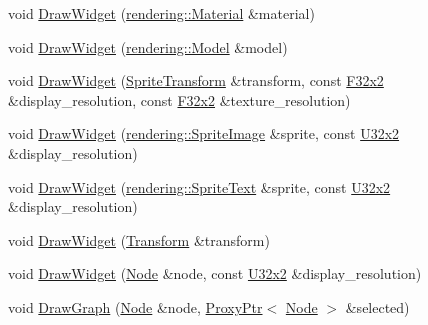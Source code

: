 \begin{DoxyCompactItemize}
\item 
void \mbox{\hyperlink{namespacemage_1_1script_1_1anonymous__namespace_02editor__script_8cpp_03_a5e0761853945b8519c6b8f39b888420a}{Draw\+Widget}} (\mbox{\hyperlink{classmage_1_1rendering_1_1_material}{rendering\+::\+Material}} \&material)
\item 
void \mbox{\hyperlink{namespacemage_1_1script_1_1anonymous__namespace_02editor__script_8cpp_03_a92235da8a7035a003232bf76ec407859}{Draw\+Widget}} (\mbox{\hyperlink{classmage_1_1rendering_1_1_model}{rendering\+::\+Model}} \&model)
\item 
void \mbox{\hyperlink{namespacemage_1_1script_1_1anonymous__namespace_02editor__script_8cpp_03_a6aee357e49d8ad3eaa7b14f3de668aac}{Draw\+Widget}} (\mbox{\hyperlink{classmage_1_1_sprite_transform}{Sprite\+Transform}} \&transform, const \mbox{\hyperlink{namespacemage_a9dc0d34d6ecc87e4cfa4a826102117bc}{F32x2}} \&display\+\_\+resolution, const \mbox{\hyperlink{namespacemage_a9dc0d34d6ecc87e4cfa4a826102117bc}{F32x2}} \&texture\+\_\+resolution)
\item 
void \mbox{\hyperlink{namespacemage_1_1script_1_1anonymous__namespace_02editor__script_8cpp_03_aa6702e2ff1562afadf04c8388556234d}{Draw\+Widget}} (\mbox{\hyperlink{classmage_1_1rendering_1_1_sprite_image}{rendering\+::\+Sprite\+Image}} \&sprite, const \mbox{\hyperlink{namespacemage_a31f2bb52b5080e706e1c13de07c0a249}{U32x2}} \&display\+\_\+resolution)
\item 
void \mbox{\hyperlink{namespacemage_1_1script_1_1anonymous__namespace_02editor__script_8cpp_03_a0912159675030c89ea49f8d96579e0f6}{Draw\+Widget}} (\mbox{\hyperlink{classmage_1_1rendering_1_1_sprite_text}{rendering\+::\+Sprite\+Text}} \&sprite, const \mbox{\hyperlink{namespacemage_a31f2bb52b5080e706e1c13de07c0a249}{U32x2}} \&display\+\_\+resolution)
\item 
void \mbox{\hyperlink{namespacemage_1_1script_1_1anonymous__namespace_02editor__script_8cpp_03_ac4b2588b097f97cf3d9bf6bbec7938ba}{Draw\+Widget}} (\mbox{\hyperlink{classmage_1_1_transform}{Transform}} \&transform)
\item 
void \mbox{\hyperlink{namespacemage_1_1script_1_1anonymous__namespace_02editor__script_8cpp_03_aa6f57f0880bb438f22ff63bde8522518}{Draw\+Widget}} (\mbox{\hyperlink{classmage_1_1_node}{Node}} \&node, const \mbox{\hyperlink{namespacemage_a31f2bb52b5080e706e1c13de07c0a249}{U32x2}} \&display\+\_\+resolution)
\item 
void \mbox{\hyperlink{namespacemage_1_1script_1_1anonymous__namespace_02editor__script_8cpp_03_a0e1c1d61b369a6c6eee68380890d5217}{Draw\+Graph}} (\mbox{\hyperlink{classmage_1_1_node}{Node}} \&node, \mbox{\hyperlink{classmage_1_1_proxy_ptr}{Proxy\+Ptr}}$<$ \mbox{\hyperlink{classmage_1_1_node}{Node}} $>$ \&selected)

\end{DoxyCompactItemize}
